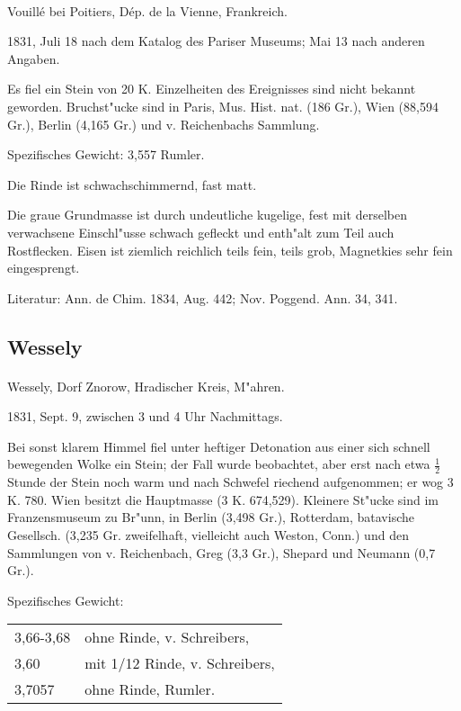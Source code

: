 \documentclass[a4paper, 11pt, oneside]{article}
\begin{document}
\paragraph{}
Vouillé bei Poitiers, Dép. de la Vienne, Frankreich.

1831, Juli 18 nach dem Katalog des Pariser Museums; Mai 13 nach anderen Angaben.

Es fiel ein Stein von 20 K. Einzelheiten des Ereignisses sind nicht bekannt geworden. Bruchst"ucke sind in Paris, Mus. Hist. nat. (186 Gr.), Wien (88,594 Gr.), Berlin (4,165 Gr.) und v. Reichenbachs Sammlung.

Spezifisches Gewicht: 3,557 Rumler.

Die Rinde ist schwachschimmernd, fast matt.

Die graue Grundmasse ist durch undeutliche kugelige, fest mit derselben verwachsene Einschl"usse schwach gefleckt und enth"alt zum Teil auch Rostflecken. Eisen ist ziemlich reichlich teils fein, teils grob, Magnetkies sehr fein eingesprengt.

\footnotesize
Literatur: Ann. de Chim. 1834, Aug. 442; Nov. Poggend. Ann. 34, 341.

\subsection{Wessely}
\normalsize
\paragraph{}
Wessely, Dorf Znorow, Hradischer Kreis, M"ahren.

1831, Sept. 9, zwischen 3 und 4 Uhr Nachmittags.

Bei sonst klarem Himmel fiel unter heftiger Detonation aus einer sich schnell bewegenden Wolke ein Stein; der Fall wurde beobachtet, aber erst nach etwa $\frac{1}{2}$ Stunde der Stein noch warm und nach Schwefel riechend aufgenommen; er wog 3 K. 780. Wien besitzt die Hauptmasse (3 K. 674,529). Kleinere St"ucke sind im Franzensmuseum zu Br"unn, in Berlin (3,498 Gr.), Rotterdam, batavische Gesellsch. (3,235 Gr. zweifelhaft, vielleicht auch Weston, Conn.) und den Sammlungen von v. Reichenbach, Greg (3,3 Gr.), Shepard und Neumann (0,7 Gr.).

Spezifisches Gewicht:  
\begin{table}[!ht]
    \centering
    \begin{tabular}{l l}
        3,66-3,68 & ohne Rinde, v. Schreibers,\\
        3,60 & mit 1/12 Rinde, v. Schreibers,\\
        3,7057 & ohne Rinde, Rumler.
    \end{tabular}
\end{table}
\end{document}
